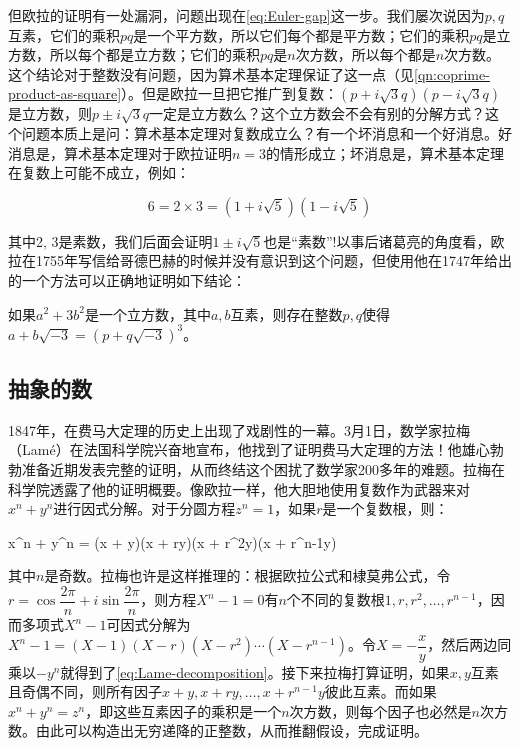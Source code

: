 \documentclass[b5paper]{ctexart}
\begin{document}
但欧拉的证明有一处漏洞，问题出现在\cref{eq:Euler-gap}这一步。我们屡次说因为$p, q$互素，它们的乘积$pq$是一个平方数，所以它们每个都是平方数；它们的乘积$pq$是立方数，所以每个都是立方数；它们的乘积$pq$是$n$次方数，所以每个都是$n$次方数。这个结论对于整数没有问题，因为算术基本定理保证了这一点（见\cref{qn:coprime-product-as-square}）。但是欧拉一旦把它推广到复数：$(p + i\sqrt{3}q)(p - i\sqrt{3}q)$是立方数，则$p \pm i\sqrt{3}q$一定是立方数么？这个立方数会不会有别的分解方式？这个问题本质上是问：算术基本定理对复数成立么？有一个坏消息和一个好消息。好消息是，算术基本定理对于欧拉证明$n = 3$的情形成立；坏消息是，算术基本定理在复数上可能不成立，例如：

\[
6 = 2 \times 3 = (1 + i\sqrt{5})(1 - i\sqrt{5})
\]

其中2, 3是素数，我们后面会证明$1 \pm i\sqrt{5}$也是“素数”!以事后诸葛亮的角度看，欧拉在1755年写信给哥德巴赫的时候并没有意识到这个问题，但使用他在1747年给出的一个方法可以正确地证明如下结论：

\begin{lemma}[欧拉]
如果$a^2 + 3b^2$是一个立方数，其中$a, b$互素，则存在整数$p, q$使得$a + b\sqrt{-3} = (p + q\sqrt{-3})^3$。
\end{lemma}

\subsection{抽象的数}

1847年，在费马大定理的历史上出现了戏剧性的一幕。3月1日，数学家拉梅（Lamé）在法国科学院兴奋地宣布，他找到了证明费马大定理的方法！他雄心勃勃准备近期发表完整的证明，从而终结这个困扰了数学家200多年的难题。拉梅在科学院透露了他的证明概要。像欧拉一样，他大胆地使用复数作为武器来对$x^n + y^n$进行因式分解。对于分圆方程$z^n = 1$，如果$r$是一个复数根，则：

\be \label{eq:Lame-decomposition}
x^n + y^n = (x + y)(x + ry)(x + r^2y)\dotsm(x + r^{n-1}y)
\ee

其中$n$是奇数。拉梅也许是这样推理的：根据欧拉公式和棣莫弗公式，令$r = \cos \dfrac{2\pi}{n} + i\sin \dfrac{2\pi}{n}$，则方程$X^n - 1 = 0$有$n$个不同的复数根$1, r, r^2, \dotsc, r^{n-1}$，因而多项式$X^n - 1$可因式分解为$X^n - 1 = (X - 1)(X - r)(X - r^2)\dotsm(X - r^{n-1})$。令$X = -\dfrac{x}{y}$，然后两边同乘以$-y^n$就得到了\cref{eq:Lame-decomposition}。接下来拉梅打算证明，如果$x, y$互素且奇偶不同，则所有因子$x + y, x + ry, \dotsc, x + r^{n-1}y$彼此互素。而如果$x^n + y^n = z^n$，即这些互素因子的乘积是一个$n$次方数，则每个因子也必然是$n$次方数。由此可以构造出无穷递降的正整数，从而推翻假设，完成证明。
\end{document}
